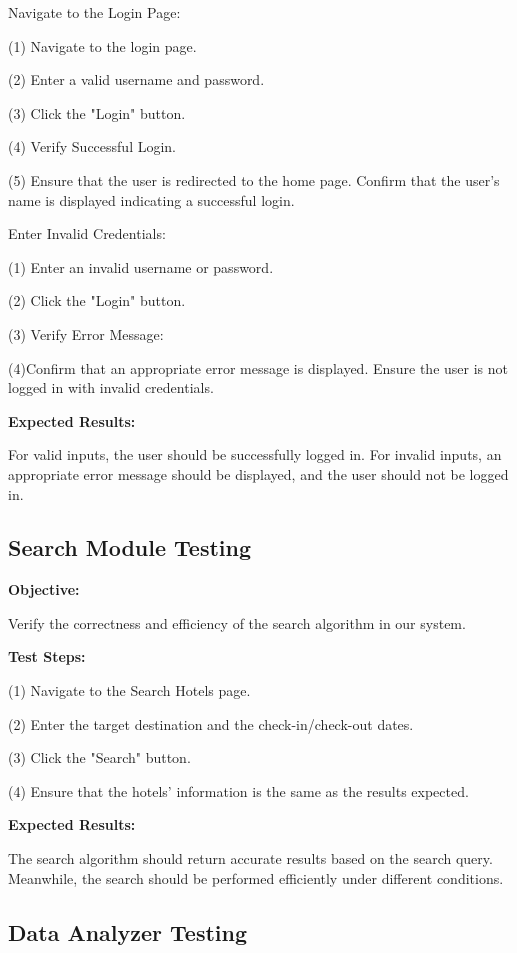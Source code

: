\documentclass[conference]{IEEEtran}
\begin{document}
Navigate to the Login Page:

(1) Navigate to the login page.

(2) Enter a valid username and password.

(3) Click the "Login" button.

(4) Verify Successful Login.

(5) Ensure that the user is redirected to the home page. Confirm that the user's name is displayed indicating a successful login.

Enter Invalid Credentials:

(1) Enter an invalid username or password.

(2) Click the "Login" button.

(3) Verify Error Message:

(4)Confirm that an appropriate error message is displayed. Ensure the user is not logged in with invalid credentials.

\textbf{Expected Results: }

For valid inputs, the user should be successfully logged in. For invalid inputs, an appropriate error message should be displayed, and the user should not be logged in.

\subsection{ \textbf{ Search Module Testing}}

\textbf{ Objective: }

Verify the correctness and efficiency of the search algorithm in our system.

\textbf{Test Steps: }

(1) Navigate to the Search Hotels page.

(2) Enter the target destination and the check-in/check-out dates.

(3) Click the "Search" button.

(4) Ensure that the hotels' information is the same as the results expected.

\textbf{Expected Results: }

The search algorithm should return accurate results based on the search query. Meanwhile, the search should be performed efficiently under different conditions.



\subsection{ \textbf{ Data Analyzer Testing}}
\end{document}
